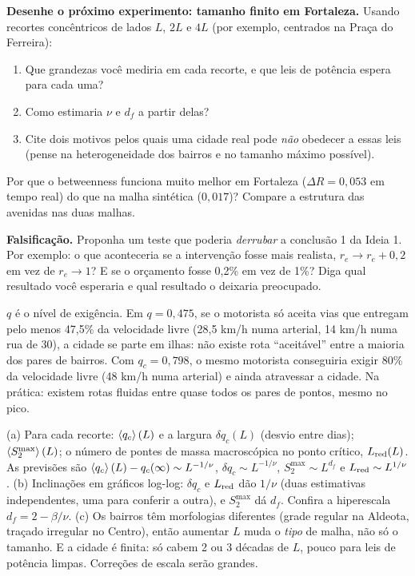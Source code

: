 \documentclass[11pt]{article}
\begin{document}
 \textbf{Desenhe o próximo experimento: tamanho finito em Fortaleza.} Usando recortes concêntricos de lados $L$, $2L$ e $4L$ (por exemplo, centrados na Praça do Ferreira):
\begin{enumerate}
  \item Que grandezas você mediria em cada recorte, e que leis de potência espera para cada uma?
  \item Como estimaria $\nu$ e $d_f$ a partir delas?
  \item Cite dois motivos pelos quais uma cidade real pode \emph{não} obedecer a essas leis (pense na heterogeneidade dos bairros e no tamanho máximo possível).
\end{enumerate}

 Por que o betweenness funciona muito melhor em Fortaleza ($\Delta R = 0{,}053$ em tempo real) do que na malha sintética ($0{,}017$)? Compare a estrutura das avenidas nas duas malhas.

 \textbf{Falsificação.} Proponha um teste que poderia \emph{derrubar} a conclusão 1 da Ideia 1. Por exemplo: o que aconteceria se a intervenção fosse mais realista, $r_e\to r_e+0{,}2$ em vez de $r_e\to1$? E se o orçamento fosse 0,2\% em vez de 1\%? Diga qual resultado você esperaria e qual resultado o deixaria preocupado.

\solucoes

$q$ é o nível de exigência. Em $q=0{,}475$, se o motorista só aceita vias que entregam pelo menos 47,5\% da velocidade livre (28,5 km/h numa arterial, 14 km/h numa rua de 30), a cidade se parte em ilhas: não existe rota ``aceitável'' entre a maioria dos pares de bairros. Com $q_c = 0{,}798$, o mesmo motorista conseguiria exigir 80\% da velocidade livre (48 km/h numa arterial) e ainda atravessar a cidade. Na prática: existem rotas fluidas entre quase todos os pares de pontos, mesmo no pico.

(a) Para cada recorte: $\left\langle q_c \right\rangle(L)$ e a largura $\delta q_c(L)$ (desvio entre dias); $\left\langle S_2^{\max} \right\rangle(L)$; o número de pontes de massa macroscópica no ponto crítico, $L_{\rm red}(L)$. As previsões são $\left\langle q_c \right\rangle(L)-q_c(\infty)\sim L^{-1/\nu}$, $\delta q_c\sim L^{-1/\nu}$, $S_2^{\max}\sim L^{d_f}$ e $L_{\rm red}\sim L^{1/\nu}$. (b) Inclinações em gráficos log-log: $\delta q_c$ e $L_{\rm red}$ dão $1/\nu$ (duas estimativas independentes, uma para conferir a outra), e $S_2^{\max}$ dá $d_f$. Confira a hiperescala $d_f = 2-\beta/\nu$. (c) Os bairros têm morfologias diferentes (grade regular na Aldeota, traçado irregular no Centro), então aumentar $L$ muda o \emph{tipo} de malha, não só o tamanho. E a cidade é finita: só cabem 2 ou 3 décadas de $L$, pouco para leis de potência limpas. Correções de escala serão grandes.
\end{document}
